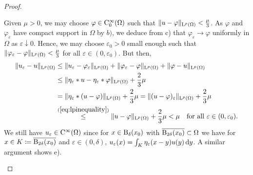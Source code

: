 \begin{proof}
\begin{enumerate}[a)]
    Given $\mu > 0$, we may choose $\varphi \in \mathrm{C}_0^\infty(\Omega)$ such that $\|u - \varphi\|_{\mathrm{L}^p(\Omega)} <  \frac{\mu}{3}$. 
    As $\varphi$ and $\varphi_\varepsilon$ have compact support in $\Omega$ by $b)$, we deduce from c) that $\varphi_\varepsilon \to \varphi$ uniformly in $\Omega$ as $\varepsilon \downarrow 0$.
    Hence, we may choose $\varepsilon_0 > 0$ small enough such that $\|\varphi_\varepsilon - \varphi\|_{\mathrm{L}^p(\Omega)} < \frac{\mu}{3}$ for all $\varepsilon \in (0, \varepsilon_0)$.
    But then,
    \begin{align*}
      \|u_\varepsilon - u\|_{\mathrm{L}^p(\Omega)}
      & \leq \|u_\varepsilon - \varphi_\varepsilon \|_{\mathrm{L}^p(\Omega)} + \|\varphi_\varepsilon - \varphi\|_{\mathrm{L}^p(\Omega)} + \|\varphi - u \|_{\mathrm{L}^p(\Omega)} \\
      &\leq \|\eta_\varepsilon \ast u - \eta_\varepsilon \ast \varphi \|_{\mathrm{L}^p(\Omega)} + \frac{2}{3} \mu \\
      &= \|\eta_\varepsilon \ast (u - \varphi) \|_{\mathrm{L}^p(\Omega)} + \frac{2}{3}\mu
      = \|(u - \varphi)_\varepsilon \|_{\mathrm{L}^p(\Omega)} + \frac{2}{3}\mu \\
      &\overset{(\ref{eq:lpinequality})}{\leq} \|u-\varphi\|_{\mathrm{L}^p(\Omega)} + \frac{2}{3}\mu < \mu \quad\text{for all } \varepsilon \in (0, \varepsilon_0).
    \end{align*}
    We still have $u_\varepsilon \in \mathrm{C}^\infty(\Omega)$ since for $x \in \mathrm{B}_\delta(x_0)$ with $\overline{\mathrm{B}_{2\delta}(x_0)} \subset \Omega$ we have for $x \in K \coloneqq \overline{\mathrm{B}_{2\delta}(x_0)}$ and $\varepsilon \in (0, \delta)$, $u_\varepsilon(x) = \int_K \eta_\varepsilon(x - y)u(y) \, {\operatorname{d}\!{y}}$.
    A similar argument shows e).\qedhere
  \end{enumerate}
\end{proof}


